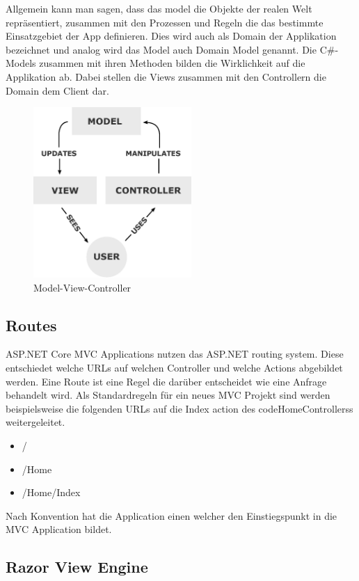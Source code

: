Allgemein kann man sagen, dass das model die Objekte der realen Welt repräsentiert, zusammen mit den Prozessen und Regeln die das  bestimmte Einsatzgebiet der App definieren. Dies wird auch als Domain der Applikation bezeichnet und analog wird das Model auch Domain Model genannt. Die C\#-Models zusammen mit ihren Methoden bilden die Wirklichkeit auf die Applikation ab. Dabei stellen die Views zusammen mit den Controllern die Domain dem Client dar.

\begin{figure}
\centering
\includegraphics[width=6cm]{Figures/mvc}
\caption{Model-View-Controller}
\label{fig:mvc}
\end{figure}


\subsection{Routes}

ASP.NET Core MVC Applications nutzen das ASP.NET routing system. Diese entschiedet welche URLs auf welchen Controller und welche Actions abgebildet werden. Eine Route ist eine Regel die darüber entscheidet wie eine Anfrage behandelt wird. Als Standardregeln für ein neues MVC Projekt sind werden beispielsweise die folgenden URLs auf die Index action des code{HomeControllers}s weitergeleitet.

\begin{itemize}

	\item /
	\item /Home
	\item /Home/Index

\end{itemize}

\noindent
Nach Konvention hat die Application einen  welcher den Einstiegspunkt in die MVC Application bildet.


\subsection{Razor View Engine}

